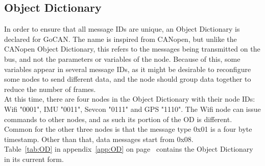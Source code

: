 \subsection{Object Dictionary}\label{sub:OD}
In order to ensure that all message IDs are unique, an Object Dictionary is declared for GoCAN.
The name is inspired from CANopen, but unlike the CANopen Object Dictionary, this refers to the messages being transmitted on the bus, and not the parameters or variables of the node.
Because of this, some variables appear in several message IDs, as it might be desirable to reconfigure some nodes to send different data, and the node should group data together to reduce the number of frames.\\

At this time, there are four nodes in the Object Dictionary with their node IDs: Wifi "0001", IMU "0011", Sevcon "0111" and GPS "1110".
The Wifi node can issue commands to other nodes, and as such its portion of the OD is different. 
Common for the other three nodes is that the message type 0x01 is a four byte timestamp.
Other than that, data messages start from 0x08.\\

Table~\ref{tab:OD} in appendix~\ref{app:OD} on page~\pageref{tab:OD} contains the Object Dictionary in its current form.